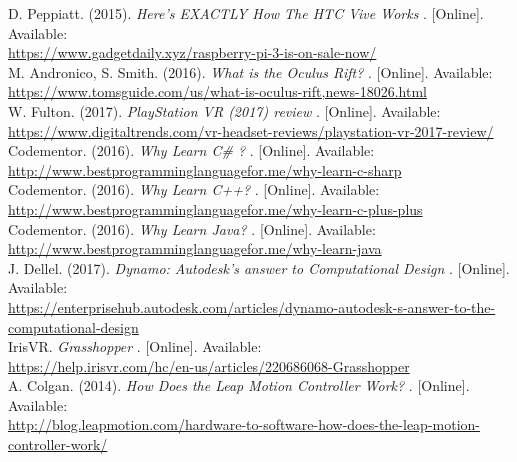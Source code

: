 \documentclass[letterpaper,10pt,onecolumn,compsoc]{IEEEtran}
\begin{document}
\begin{thebibliography}{9}

D. Peppiatt. (2015). 
\textit{Here's EXACTLY How The HTC Vive Works} 
. [Online]. Available: 
\\\url{https://www.gadgetdaily.xyz/raspberry-pi-3-is-on-sale-now/}
\\
M. Andronico, S. Smith. (2016). 
\textit{What is the Oculus Rift?} 
. [Online]. Available: 
\\\url{https://www.tomsguide.com/us/what-is-oculus-rift,news-18026.html}
\\
W. Fulton. (2017). 
\textit{PlayStation VR (2017) review} 
. [Online]. Available: 
\\\url{https://www.digitaltrends.com/vr-headset-reviews/playstation-vr-2017-review/}
\\
Codementor. (2016). 
\textit{Why Learn C\# ?} 
. [Online]. Available: 
\\\url{http://www.bestprogramminglanguagefor.me/why-learn-c-sharp}
\\
Codementor. (2016). 
\textit{Why Learn C++?} 
. [Online]. Available: 
\\\url{http://www.bestprogramminglanguagefor.me/why-learn-c-plus-plus}
\\
Codementor. (2016). 
\textit{Why Learn Java?} 
. [Online]. Available: 
\\\url{http://www.bestprogramminglanguagefor.me/why-learn-java}
\\
J. Dellel. (2017). 
\textit{Dynamo: Autodesk's answer to Computational Design} 
. [Online]. Available: 
\\\url{https://enterprisehub.autodesk.com/articles/dynamo-autodesk-s-answer-to-the-computational-design}
\\
IrisVR. 
\textit{Grasshopper} 
. [Online]. Available: 
\\\url{https://help.irisvr.com/hc/en-us/articles/220686068-Grasshopper}
\\
A. Colgan. (2014). 
\textit{How Does the Leap Motion Controller Work?} 
. [Online]. Available: 
\\\url{http://blog.leapmotion.com/hardware-to-software-how-does-the-leap-motion-controller-work/}

\iffalse
\bibitem{first}
F. Author. (year). 
\textit{title} 
. [Online]. Available: 
\\\url{URL}
\fi

\end{thebibliography}
\end{document}
